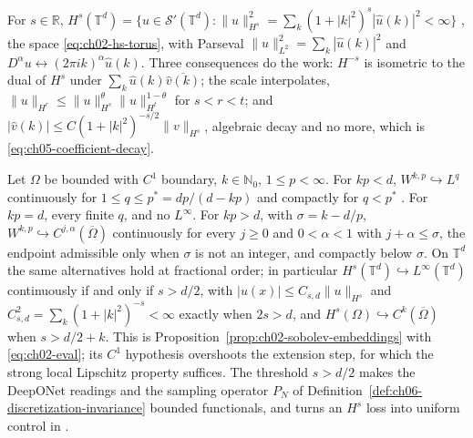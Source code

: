 \begin{definition}
\label{def:appa-hs}
For $s \in \mathbb{R}$, $H^s(\mathbb{T}^d) = \{ u \in \mathcal{S}'(\mathbb{T}^d) :
\|u\|_{H^s}^2 = \sum_k (1+|k|^2)^s |\hat{u}(k)|^2 < \infty \}$ \cite{brezis2011functional},
the space \eqref{eq:ch02-hs-torus},
with Parseval $\|u\|_{L^2}^2 = \sum_k |\hat{u}(k)|^2$ and
$D^\alpha u \leftrightarrow (2\pi i k)^\alpha \hat{u}(k)$. Three consequences do the work:
$H^{-s}$ is isometric to the dual of $H^s$ under $\sum_k \hat{u}(k)\overline{\hat{v}(k)}$;
the scale interpolates, $\|u\|_{H^r} \le \|u\|_{H^s}^{\theta}\|u\|_{H^t}^{1-\theta}$ for
$s < r < t$; and $|\hat{v}(k)| \le C(1+|k|^2)^{-s/2}\|v\|_{H^s}$, algebraic decay and no more,
which is \eqref{eq:ch05-coefficient-decay}.
\end{definition}

\begin{proposition}\label{prop:appa-embeddings}
Let $\Omega$ be bounded with $C^1$ boundary, $k \in \mathbb{N}_0$, $1 \le p < \infty$. For
$kp < d$, $W^{k,p} \hookrightarrow L^q$ continuously for $1 \le q \le p^* = dp/(d-kp)$ and
compactly for $q < p^*$ \cite{evans2010partial, brezis2011functional}. For $kp = d$, every
finite $q$, and no $L^\infty$. For $kp > d$,
with $\sigma = k - d/p$, $W^{k,p} \hookrightarrow C^{j,\alpha}(\overline{\Omega})$
continuously for every $j \ge 0$ and $0 < \alpha < 1$ with $j + \alpha \le \sigma$, the
endpoint admissible only when $\sigma$ is not an integer, and compactly below $\sigma$. On
$\mathbb{T}^d$ the same alternatives hold at fractional order; in particular
$H^s(\mathbb{T}^d) \hookrightarrow L^\infty(\mathbb{T}^d)$ continuously if and only if
$s > d/2$, with $|u(x)| \le C_{s,d}\|u\|_{H^s}$ and
$C_{s,d}^2 = \sum_k (1+|k|^2)^{-s} < \infty$ exactly when $2s > d$, and
$H^s(\Omega) \hookrightarrow C^k(\overline{\Omega})$ when $s > d/2 + k$. This is
Proposition~\ref{prop:ch02-sobolev-embeddings} with \eqref{eq:ch02-eval}; its $C^1$ hypothesis
overshoots the extension step, for which the strong local Lipschitz property suffices.
The threshold $s > d/2$ makes the DeepONet readings and the sampling operator $P_N$ of
Definition~\ref{def:ch06-discretization-invariance} bounded functionals, and turns an $H^s$
loss into uniform control in
.
\end{proposition}


